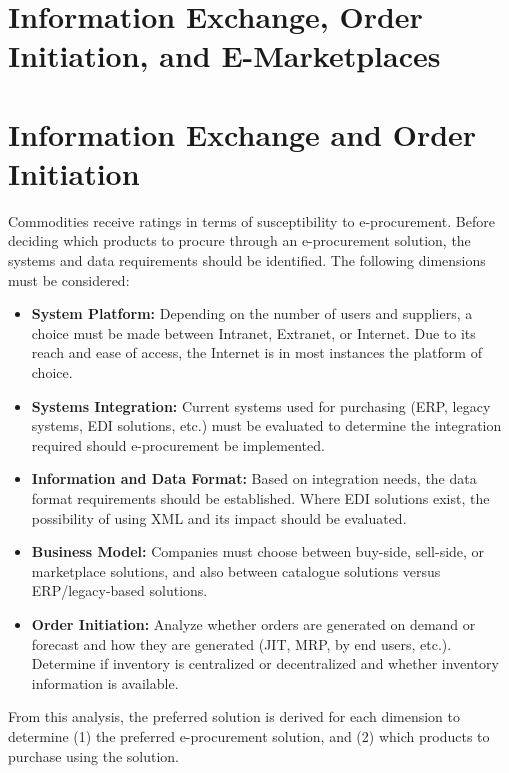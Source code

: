 \documentclass[12pt,a4paper]{article}
\begin{document}
\section*{Information Exchange, Order Initiation, and E-Marketplaces}

\section{Information Exchange and Order Initiation}

Commodities receive ratings in terms of susceptibility to e-procurement. Before deciding which products to procure through an e-procurement solution, the systems and data requirements should be identified. The following dimensions must be considered:

\begin{itemize}
    \item \textbf{System Platform:} Depending on the number of users and suppliers, a choice must be made between Intranet, Extranet, or Internet. Due to its reach and ease of access, the Internet is in most instances the platform of choice.
    \item \textbf{Systems Integration:} Current systems used for purchasing (ERP, legacy systems, EDI solutions, etc.) must be evaluated to determine the integration required should e-procurement be implemented.
    \item \textbf{Information and Data Format:} Based on integration needs, the data format requirements should be established. Where EDI solutions exist, the possibility of using XML and its impact should be evaluated.
    \item \textbf{Business Model:} Companies must choose between buy-side, sell-side, or marketplace solutions, and also between catalogue solutions versus ERP/legacy-based solutions.
    \item \textbf{Order Initiation:} Analyze whether orders are generated on demand or forecast and how they are generated (JIT, MRP, by end users, etc.). Determine if inventory is centralized or decentralized and whether inventory information is available.
\end{itemize}

From this analysis, the preferred solution is derived for each dimension to determine (1) the preferred e-procurement solution, and (2) which products to purchase using the solution.
\end{document}
